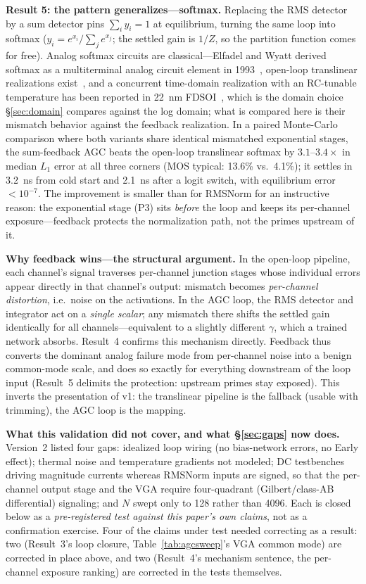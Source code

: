 \documentclass[11pt]{article}
\begin{document}
\textbf{Result 5: the pattern generalizes---softmax.} Replacing the RMS detector by a sum detector pins $\sum_i y_i = 1$ at equilibrium, turning the same loop into softmax ($y_i = e^{x_i}/\sum_j e^{x_j}$; the settled gain is $1/Z$, so the partition function comes for free). Analog softmax circuits are classical---Elfadel and Wyatt derived softmax as a multiterminal analog circuit element in 1993~\cite{elfadel1993}, open-loop translinear realizations exist~\cite{sillman2023}, and a concurrent time-domain realization with an RC-tunable temperature has been reported in 22~nm FDSOI~\cite{singh2026}, which is the domain choice \S\ref{sec:domain} compares against the log domain; what is compared here is their mismatch behavior against the feedback realization. In a paired Monte-Carlo comparison where both variants share identical mismatched exponential stages, the sum-feedback AGC beats the open-loop translinear softmax by $3.1$--$3.4\times$ in median $L_1$ error at all three corners (MOS typical: 13.6\% vs.\ 4.1\%); it settles in 3.2~ns from cold start and 2.1~ns after a logit switch, with equilibrium error $<\!10^{-7}$. The improvement is smaller than for RMSNorm for an instructive reason: the exponential stage (P3) sits \textit{before} the loop and keeps its per-channel exposure---feedback protects the normalization path, not the primes upstream of it.

\textbf{Why feedback wins---the structural argument.} In the open-loop pipeline, each channel's signal traverses per-channel junction stages whose individual errors appear directly in that channel's output: mismatch becomes \textit{per-channel distortion}, i.e.\ noise on the activations. In the AGC loop, the RMS detector and integrator act on a \textit{single scalar}; any mismatch there shifts the settled gain identically for all channels---equivalent to a slightly different $\gamma$, which a trained network absorbs. Result~4 confirms this mechanism directly. Feedback thus converts the dominant analog failure mode from per-channel noise into a benign common-mode scale, and does so exactly for everything downstream of the loop input (Result~5 delimits the protection: upstream primes stay exposed). This inverts the presentation of v1: the translinear pipeline is the fallback (usable with trimming), the AGC loop is the mapping.

\textbf{What this validation did not cover, and what \S\ref{sec:gaps} now does.} Version~2 listed four gaps: idealized loop wiring (no bias-network errors, no Early effect); thermal noise and temperature gradients not modeled; DC testbenches driving magnitude currents whereas RMSNorm inputs are signed, so that the per-channel output stage and the VGA require four-quadrant (Gilbert/class-AB differential) signaling; and $N$ swept only to 128 rather than 4096. Each is closed below as a \textit{pre-registered test against this paper's own claims}, not as a confirmation exercise. Four of the claims under test needed correcting as a result: two (Result~3's loop closure, Table~\ref{tab:agcsweep}'s VGA common mode) are corrected in place above, and two (Result~4's mechanism sentence, the per-channel exposure ranking) are corrected in the tests themselves.
\end{document}
